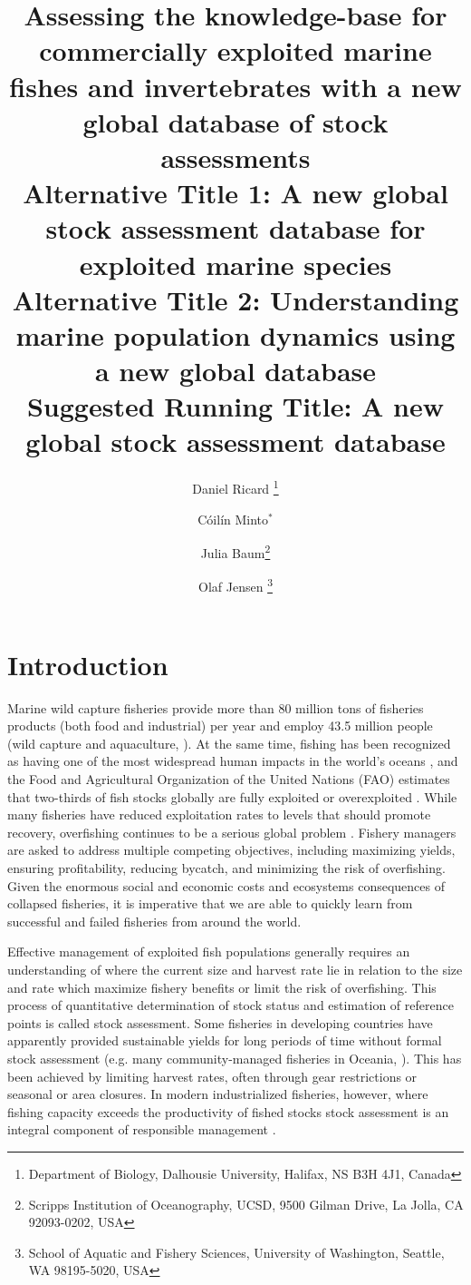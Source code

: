 \documentclass[letterpaper,12pt]{article}
\title{Assessing the knowledge-base for commercially exploited marine fishes and invertebrates with a new global database of stock assessments \\ \vspace{0.5cm} Alternative Title 1: A new global stock assessment database for exploited marine species \\ \vspace{0.5cm} Alternative Title 2: Understanding marine population dynamics using a new global database \\ \vspace{0.5cm} Suggested Running Title: A new global stock assessment database}
\author{Daniel Ricard \thanks{Department of Biology, Dalhousie University, Halifax, NS B3H 4J1, Canada} \and C{\'o}il{\'i}n Minto$^{*}$ \and Julia Baum\thanks{Scripps Institution of Oceanography, UCSD, 9500 Gilman Drive, La Jolla, CA 92093-0202, USA} \and Olaf Jensen \thanks{School of Aquatic and Fishery Sciences, University of Washington, Seattle, WA  98195-5020, USA}}
\begin{document}
\maketitle{}
\newpage




\section*{Introduction}

Marine wild capture fisheries provide more than 80 million tons of
fisheries products (both food and industrial) per year and employ 43.5
million people (wild capture and aquaculture, \citep{FAO:fishstat}).
At the same time, fishing has been recognized as having one of the
most widespread human impacts in the world's oceans
\citep{Halpern:etal:2008:science}, and the Food and Agricultural
Organization of the United Nations (FAO) estimates that two-thirds of
fish stocks globally are fully exploited or overexploited
\citep{FAO:fishstat}.  While many fisheries have reduced exploitation
rates to levels that should promote recovery, overfishing continues to
be a serious global problem \citep{Worm:etal:2009:science}.  Fishery
managers are asked to address multiple competing objectives, including
maximizing yields, ensuring profitability, reducing bycatch, and
minimizing the risk of overfishing.  Given the enormous social and
economic costs \citep{Rice:etal:2003:icescm} and ecosystems
consequences \citep{Frank:etal:2005:science, Myers:etal:2007:science}
of collapsed fisheries, it is imperative that we are able to quickly
learn from successful and failed fisheries from around the world.

Effective management of exploited fish populations generally requires
an understanding of where the current size and harvest rate
lie in relation to the size and rate which maximize
fishery benefits or limit the risk of overfishing.  This process of
quantitative determination of stock status and estimation of reference
points is called stock assessment.  Some fisheries in developing
countries have apparently provided sustainable yields for long periods
of time without formal stock assessment (e.g. many community-managed
fisheries in Oceania, \citep{Johannes:2002:arees}).  This has been achieved by
limiting harvest rates, often through gear restrictions or seasonal or
area closures.  In modern industrialized fisheries, however, where fishing
capacity exceeds the productivity of fished stocks stock
assessment is an integral component of responsible
management \citep{Hilborn:Walters:1992}.
\end{document}
